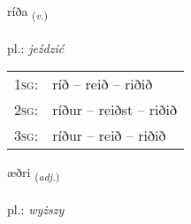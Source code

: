 \documentclass[frontgrid, backgrid]{flacards}\usepackage[]{graphicx}\usepackage[]{xcolor}
\begin{document}
\renewcommand{\flhead}{\vskip5pt \fboxsep=0pt {\small\bfseries\footnotesize Sagnorð | Verb}}
\renewcommand{\fcfoot}{\vskip5pt \fboxsep=0pt \hspace{2pt}{\small\bfseries\footnotesize 2K}}

\renewcommand{\blhead}{\vskip5pt {\small\bfseries\footnotesize Sagnorð | Verb }}
\renewcommand{\bcfoot}{\vskip5pt \hspace{2pt}{\small\bfseries\footnotesize 2K}}


{ríða \small{\textsubscript{(\textit{v.})}} \\[1ex] %
\textphonetic{[riːða]} \\
pl.: \emph{jeździć} \\  [2ex]
\renewcommand*{\arraystretch}{0.8}
\begin{tabular}{p{1cm}l}
\textsc{1sg}: & ríð -- reið -- riðið \\ 
\textsc{2sg}: & ríður -- reiðst -- riðið \\ 
\textsc{3sg}: & ríður -- reið -- riðið \\ 
\end{tabular}
}

\renewcommand{\flhead}{\vskip5pt \fboxsep=0pt {\small\bfseries\footnotesize Lýsingarorð | Adjective}}
\renewcommand{\fcfoot}{\vskip5pt \fboxsep=0pt \hspace{2pt}{\small\bfseries\footnotesize 2K}}

\renewcommand{\blhead}{\vskip5pt {\small\bfseries\footnotesize Lýsingarorð | Adjective }}
\renewcommand{\bcfoot}{\vskip5pt \hspace{2pt}{\small\bfseries\footnotesize 2K}}


{æðri \small{\textsubscript{(\textit{adj.})}} \\[1ex] %
\textphonetic{[aiðrɪ]} \\
pl.: \emph{wyższy} \\  [2ex]
\renewcommand*{\arraystretch}{0.8}
}
\end{document}
